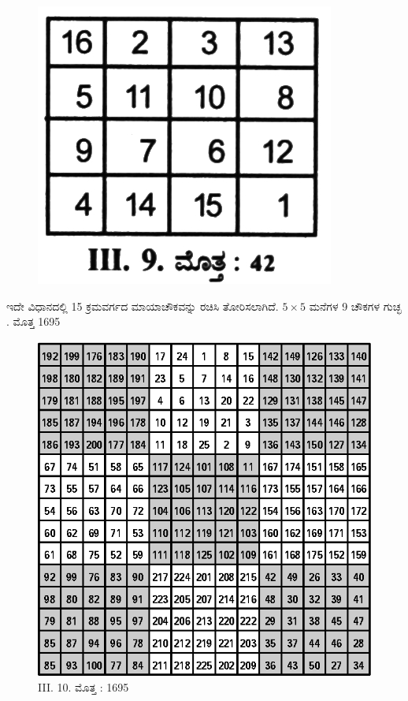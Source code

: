 	\begin{figure}[H]
	\includegraphics[scale=1.3]{src/figures/chap3/fig3-36.jpg}
	\end{figure}
\eject

	ಇದೇ ವಿಧಾನದಲ್ಲಿ 15 ಕ್ರಮವರ್ಗದ ಮಾಯಾಚೌಕವನ್ನು ರಚಿಸಿ ತೋರಿಸಲಾಗಿದೆ. $5 \times 5$ ಮನೆಗಳ 9 ಚೌಕಗಳ ಗುಚ್ಛ . ಮೊತ್ತ 1695
	\begin{figure}[H]
	\includegraphics[scale=1.2]{src/figures/chap3/fig3-37.eps}
	\caption*{III. 10. ಮೊತ್ತ : 1695}
	\end{figure}

